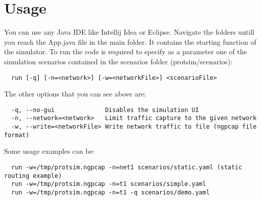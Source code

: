 \section{Usage}
You can use any Java IDE like Intellij Idea or Eclipse.
Navigate the folders untill you reach the App.java file in the main folder. It contains the starting function of the simulator.\newline
To run the code is required to specify as a parameter one of the simulation scenarios contained in the scenarios folder (protsim/scenarios):
\begin{verbatim}
  run [-q] [-n=<network>] [-w=<networkFile>] <scenarioFile>
\end{verbatim}
The other options that you can see above are:
\begin{verbatim}
  -q, --no-gui              Disables the simulation UI
  -n, --network=<network>   Limit traffic capture to the given network
  -w, --write=<networkFile> Write network traffic to file (ngpcap file format)
\end{verbatim}
Some usage examples can be:
\begin{verbatim}
  run -w=/tmp/protsim.ngpcap -n=net1 scenarios/static.yaml (static routing example)
  run -w=/tmp/protsim.ngpcap -n=t1 scenarios/simple.yaml
  run -w=/tmp/protsim.ngpcap -n=t1 -q scenarios/demo.yaml
\end{verbatim}
